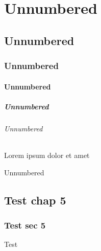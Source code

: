\documentclass{article}
\begin{document}
    \part*{Unnumbered}
    \chapter*{Unnumbered}
    \section*{Unnumbered}
    \subsection*{Unnumbered}
    \subsubsection*{Unnumbered}
    \paragraph*{Unnumbered} Lorem ipsum dolor et amet
    \subparagraph*{Unnumbered}
    
    \backmatter
    \chapter{Test chap 5}
    \section{Test sec 5}
    
    \appendix
    
    
    Test
\end{document}
